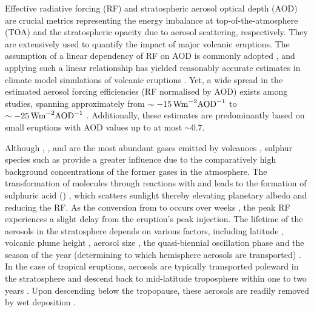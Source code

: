 \documentclass[draft]{agujournal2019}
\begin{document}
Effective radiative forcing (RF) and stratospheric aerosol optical depth (AOD) are
crucial metrics representing the energy imbalance at top-of-the-atmosphere (TOA) and the
stratospheric opacity due to aerosol scattering, respectively. They are extensively used
to quantify the impact of major volcanic eruptions. The assumption of a linear
dependency of RF on AOD is commonly adopted \cite{myhre2013,andersson2015}, and applying
such a linear relationship has yielded reasonably accurate estimates in climate model
simulations of volcanic eruptions
\cite{mills2017,hansen2005,gregory2016,marshall2020,pitari2016b}. Yet, a wide spread in
the estimated aerosol forcing efficiencies (RF normalised by AOD) exists among studies,
spanning approximately from \(\sim \SI{-15}{\watt\metre^{-2}\ce{AOD}^{-1}}\)
\cite{pitari2016b} to \(\sim \SI{-25}{\watt\metre^{-2}\ce{AOD}^{-1}}\) \cite{myhre2013}.
Additionally, these estimates are predominantly based on small eruptions with AOD values
up to at most \(\sim 0.7\).

Although , , and  are the most abundant gases emitted by
volcanoes \cite{robock2000}, sulphur species such as  provide a greater
influence due to the comparatively high background concentrations of the former gases in
the atmosphere. The transformation of  molecules through reactions with 
and  leads to the formation of sulphuric acid () \cite{robock2000},
which scatters sunlight thereby elevating planetary albedo and reducing the RF. As the
conversion from  to  occurs over weeks \cite{robock2000}, the peak RF
experiences a slight delay from the eruption's peak  injection. The lifetime of
the  aerosols in the stratosphere depends on various factors, including
latitude \cite{marshall2019, toohey2019}, volcanic plume height \cite{marshall2019},
aerosol size \cite{marshall2019}, the quasi-biennial oscillation phase
\cite{pitari2016b} and the season of the year (determining to which hemisphere aerosols
are transported) \cite{toohey2011,toohey2019}. In the case of tropical eruptions,
aerosols are typically transported poleward in the stratosphere and descend back to
mid-latitude troposphere within one to two years \cite{robock2000}. Upon descending
below the tropopause, these aerosols are readily removed by wet deposition
\cite{liu2012}.
\end{document}
